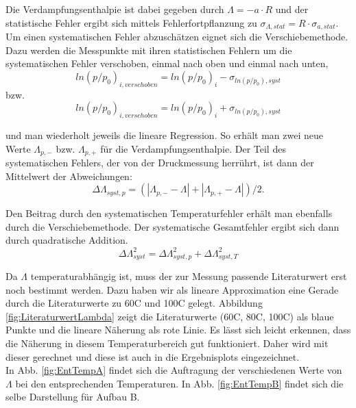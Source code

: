 \documentclass[12pt,a4paper]{article}
\begin{document}
Die Verdampfungsenthalpie ist dabei gegeben durch $\Lambda=-a \cdot R$ und der statistische Fehler ergibt sich mittels Fehlerfortpflanzung zu $\sigma_{\Lambda, stat}=R \cdot \sigma_{a,stat}$.\\
Um einen systematischen Fehler abzuschätzen eignet sich die Verschiebemethode. Dazu werden die Messpunkte mit ihren statistischen Fehlern um die systematischen Fehler verschoben, einmal nach oben und einmal nach unten,   \\

\begin{equation}
	ln(p/p_0)_{i, verschoben} = ln(p/p_0)_{i} - \sigma _{ln(p/p_0), syst}
\end{equation}
bzw.
\begin{equation}
	ln(p/p_0)_{i, verschoben} = ln(p/p_0)_{i} + \sigma _{ln(p/p_0), syst}
\end{equation}

und man wiederholt jeweils die lineare Regression. So erhält man zwei neue Werte $\Lambda_{p,-}$ bzw. $\Lambda_{p,+}$ für die Verdampfungsenthalpie. Der Teil des systematischen Fehlers, der von der Druckmessung herrührt, ist dann der Mittelwert der Abweichungen:
\begin{equation}
	\Delta \Lambda _{syst,p} = ( |\Lambda_{p,-}-\Lambda| + |\Lambda_{p,+} - \Lambda|)/2 .
\end{equation}

Den Beitrag durch den systematischen Temperaturfehler erhält man ebenfalls durch die Verschiebemethode. Der systematische Gesamtfehler ergibt sich dann durch quadratische Addition.\\

\begin{equation}
\Delta \Lambda_{syst}^2 = \Delta \Lambda_{syst,p}^2 + \Delta \Lambda_{syst,T}^2
\end{equation}

Da $\Lambda$ temperaturabhängig ist, muss der zur Messung passende Literaturwert erst noch bestimmt werden. Dazu haben wir als lineare Approximation eine Gerade durch die Literaturwerte zu 60C und 100C gelegt. Abbildung \ref{fig:LiteraturwertLambda} zeigt die Literaturwerte (60C, 80C, 100C) als blaue Punkte und die lineare Näherung als rote Linie. Es lässt sich leicht erkennen, dass die Näherung in diesem Temperaturbereich gut funktioniert. Daher wird mit dieser gerechnet und diese ist auch in die Ergebnisplots eingezeichnet. \\
In Abb. \ref{fig:EntTempA} findet sich die Auftragung der verschiedenen Werte von $\Lambda$ bei den entsprechenden Temperaturen. In Abb. \ref{fig:EntTempB} findet sich die selbe Darstellung für Aufbau B.\\
\end{document}
